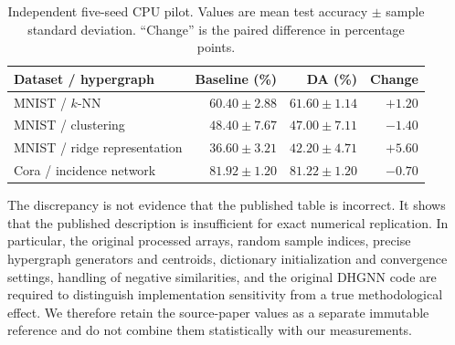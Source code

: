 \begin{table}[t]
\centering
\caption{Independent five-seed CPU pilot. Values are mean test accuracy
$\pm$ sample standard deviation. ``Change'' is the paired difference in
percentage points.}
\label{tab:pilot-reproduction}
\scriptsize
\begin{tabular}{lrrr}
\toprule
Dataset / hypergraph & Baseline (\%) & DA (\%) & Change \\
\midrule
MNIST / $k$-NN & $60.40\pm2.88$ & $61.60\pm1.14$ & $+1.20$ \\
MNIST / clustering & $48.40\pm7.67$ & $47.00\pm7.11$ & $-1.40$ \\
MNIST / ridge representation & $36.60\pm3.21$ & $42.20\pm4.71$ & $+5.60$ \\
Cora / incidence network & $81.92\pm1.20$ & $81.22\pm1.20$ & $-0.70$ \\
\bottomrule
\end{tabular}
\end{table}

The discrepancy is not evidence that the published table is incorrect.  It
shows that the published description is insufficient for exact numerical
replication.  In particular, the original processed arrays, random sample
indices, precise hypergraph generators and centroids, dictionary initialization
and convergence settings, handling of negative similarities, and the original
DHGNN code are required to distinguish implementation sensitivity from a true
methodological effect.  We therefore retain the source-paper values as a
separate immutable reference and do not combine them statistically with our
measurements.
